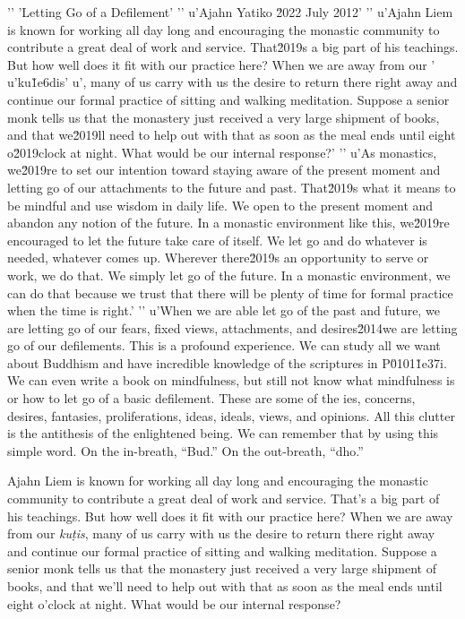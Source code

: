 '\n'
'Letting Go of a Defilement'
'\n'
u'Ajahn Yatiko \u2022 July 2012'
'\n'
u'Ajahn Liem is known for working all day long and encouraging the monastic community to contribute a great deal of work and service. That\u2019s a big part of his teachings. But how well does it fit with our practice here? When we are away from our '
u'ku\u1e6dis'
u', many of us carry with us the desire to return there right away and continue our formal practice of sitting and walking meditation. Suppose a senior monk tells us that the monastery just received a very large shipment of books, and that we\u2019ll need to help out with that as soon as the meal ends until eight o\u2019clock at night. What would be our internal response?'
'\n'
u'As monastics, we\u2019re to set our intention toward staying aware of the present moment and letting go of our attachments to the future and past. That\u2019s what it means to be mindful and use wisdom in daily life. We open to the present moment and abandon any notion of the future. In a monastic environment like this, we\u2019re encouraged to let the future take care of itself. We let go and do whatever is needed, whatever comes up. Wherever there\u2019s an opportunity to serve or work, we do that. We simply let go of the future. In a monastic environment, we can do that because we trust that there will be plenty of time for formal practice when the time is right.'
'\n'
u'When we are able let go of the past and future, we are letting go of our fears, fixed views, attachments, and desires\u2014we are letting go of our defilements. This is a profound experience. We can study all we want about Buddhism and have incredible knowledge of the scriptures in P\u0101\u1e37i. We can even write a book on mindfulness, but still not know what mindfulness is or how to let go of a basic defilement. These are some of the ies, concerns, desires, fantasies, 
proliferations, ideas, ideals, views, and opinions. All this clutter is 
the antithesis of the enlightened being. We can remember that by using 
this simple word. On the in-breath, ``Bud.'' On the out-breath, ``dho.''


Ajahn Liem is known for working all day long and encouraging the 
monastic community to contribute a great deal of work and service. 
That's a big part of his teachings. But how well does it fit with our 
practice here? When we are away from our \emph{kuṭis}, many of us 
carry with us the desire to return there right away and continue our 
formal practice of sitting and walking meditation. Suppose a senior 
monk tells us that the monastery just received a very large shipment of 
books, and that we'll need to help out with that as soon as the meal 
ends until eight o'clock at night. What would be our internal response?


